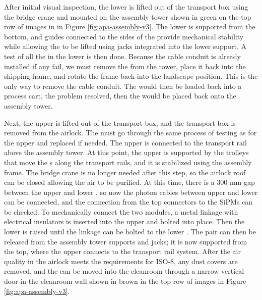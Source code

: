 After initial visual inspection, the lower  is lifted out of the transport box 
using the bridge crane and mounted on the  assembly tower shown in green on the top row of images in in Figure \ref{fig:apa-assembly-v3}. 
The  lower  is supported from the bottom, and guides connected to the sides of the  provide mechanical stability while allowing the  to be lifted using jacks integrated into the lower support. A test of all the  in the lower  is then done.  Because the cable conduit is already installed if any  fail, we must remove the  from the tower, place it back into the shipping frame, and rotate the frame back into the landscape position.  This is the only way to remove the cable conduit. The  would then be loaded back into a process cart, the problem resolved, then the  would be placed back onto the assembly tower. 

Next, the upper  is lifted out of the transport box, and the transport box is removed from the airlock. The  must go through the same process of testing as for the upper  and replaced if needed. The upper  is connected to the transport rail above the  assembly tower. At this point, the upper  is supported by the trolleys that move the s along the transport rails, and it is stabilized using the  assembly frame. 
The bridge crane is no longer needed after this step, so the airlock roof can be closed allowing the air to be purified. At this time, there is a 300 \si{mm} gap between the upper and lower , so now the photon cables between upper and lower  can be connected, and the connection from the top connectors to the SiPMs can be checked. 
To mechanically connect the two  modules, a metal linkage with electrical insulators is inserted into the upper  and bolted into place. Then the lower  is raised until the linkage can be bolted to the lower .  
The  pair can then be released from the assembly tower supports and jacks; it is now supported from the top, where the upper  connects to the transport rail system.
After the air quality in the airlock meets the requirements for ISO-8, any dust covers are removed, and the  can be moved into the cleanroom through a narrow vertical door in the cleanroom wall shown in brown in the top row of images in Figure \ref{fig:apa-assembly-v3}.


